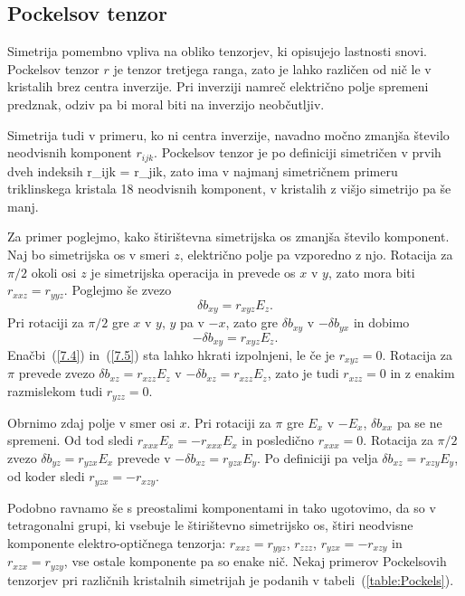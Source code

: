 \subsection*{Pockelsov tenzor}
Simetrija pomembno vpliva na obliko tenzorjev, ki opisujejo lastnosti
snovi. Pockelsov tenzor $r$ je tenzor tretjega ranga, zato je lahko različen
od nič le v kristalih brez centra inverzije. Pri inverziji namreč električno 
polje spremeni predznak, odziv pa bi moral biti na inverzijo neobčutljiv. 

Simetrija tudi v primeru, ko ni centra inverzije, navadno močno
zmanjša število neodvisnih komponent $r_{ijk}$. Pockelsov tenzor
je po definiciji simetričen v prvih dveh indeksih
\beq
r_{ijk} = r_{jik},
\eeq
zato ima v najmanj simetričnem primeru triklinskega kristala 18 neodvisnih komponent,
v kristalih z višjo simetrijo pa še manj. 

Za primer poglejmo, kako štirištevna simetrijska os zmanjša število komponent. 
Naj bo simetrijska os v smeri $z$, električno polje pa vzporedno z njo.
Rotacija za $\pi/2$ okoli osi $z$ je simetrijska operacija in prevede
os $x$ v $y$, zato mora biti $r_{xxz}=r_{yyz}$. Poglejmo še zvezo 
\begin{equation}
\delta b_{xy}=r_{xyz}E_{z}.
\label{7.4}
\end{equation}
Pri rotaciji za $\pi/2$ gre $x$ v $y$, $y$ pa v $-x$, zato gre
$\delta b_{xy}$ v $-\delta b_{yx}$ in dobimo 
\begin{equation}
-\delta b_{xy}=r_{xyz}E_{z}.
\label{7.5}
\end{equation}
Enačbi~(\ref{7.4}) in~(\ref{7.5}) sta lahko hkrati izpolnjeni, le če je $r_{xyz}=0$.
Rotacija za $\pi$ prevede zvezo $\delta b_{xz}=r_{xzz}E_{z}$ v $-\delta b_{xz}=r_{xzz}E_{z}$,
zato je tudi $r_{xzz}=0$ in z enakim razmislekom tudi $r_{yzz}=0$.

Obrnimo zdaj polje v smer osi $x$. Pri rotaciji za $\pi$ gre $E_{x}$
v $-E_{x}$, $\delta b_{xx}$ pa se ne spremeni. Od tod sledi $r_{xxx}E_{x}=-r_{xxx}E_{x}$ in 
posledično $r_{xxx}=0$. Rotacija za $\pi/2$ zvezo $\delta b_{yz}=r_{yzx}E_{x}$
prevede v $-\delta b_{xz}=r_{yzx}E_{y}$. Po definiciji pa velja $\delta b_{xz}=r_{xzy}E_{y}$,
od koder sledi $r_{yzx}=-r_{xzy}$.

Podobno ravnamo še s preostalimi komponentami in tako ugotovimo, da
so v tetragonalni grupi, ki vsebuje le štirištevno simetrijsko os, štiri neodvisne
komponente elektro-optičnega tenzorja: $r_{xxz}=r_{yyz}$, $r_{zzz}$,
$r_{yzx}=-r_{xzy}$ in $r_{xzx}=r_{yzy}$, vse ostale komponente pa
so enake nič. Nekaj primerov Pockelsovih tenzorjev pri različnih kristalnih simetrijah
je podanih v tabeli~(\ref{table:Pockels}).

